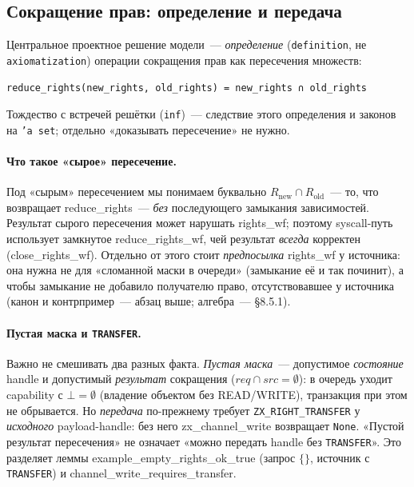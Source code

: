 \documentclass[11pt,a4paper]{article}
\newcommand{\isabel}[1]{{\isabelleit #1}}
\newcommand{\lemmaname}[1]{\isabel{#1}}
\begin{document}
\subsection{Сокращение прав: определение и передача}

Центральное проектное решение модели~--- \emph{определение}
(\texttt{definition}, не \texttt{axiomatization}) операции сокращения
прав как пересечения множеств:
\begin{lstlisting}
reduce_rights(new_rights, old_rights) = new_rights ∩ old_rights
\end{lstlisting}
Тождество с встречей решётки (\texttt{inf})~--- следствие этого определения
и законов на \texttt{'a~set}; отдельно «доказывать пересечение» не нужно.

\paragraph{Что такое «сырое» пересечение.}
Под «сырым» пересечением мы понимаем буквально
$R_{\mathrm{new}} \cap R_{\mathrm{old}}$~--- то, что возвращает
\lemmaname{reduce\_rights}~--- \emph{без} последующего замыкания
зависимостей. Результат сырого пересечения может нарушать
\lemmaname{rights\_wf}; поэтому syscall-путь использует замкнутое
\lemmaname{reduce\_rights\_wf}, чей результат \emph{всегда}
корректен (\lemmaname{close\_rights\_wf}). Отдельно от этого стоит
\emph{предпосылка} \lemmaname{rights\_wf} у источника: она нужна не для
«сломанной маски в очереди» (замыкание её и так починит), а чтобы
замыкание не добавило получателю право, отсутствовавшее у источника
(канон и контрпример~--- абзац выше; алгебра~--- §8.5.1).

\paragraph{Пустая маска и \texttt{TRANSFER}.}
Важно не смешивать два разных факта. \emph{Пустая маска}~--- допустимое
\emph{состояние} handle и допустимый \emph{результат} сокращения
($\mathit{req}\cap\mathit{src}=\emptyset$): в очередь уходит
\textenglish{capability} с $\bot=\emptyset$ (владение объектом без
READ/WRITE), транзакция при этом не обрывается. Но \emph{передача}
по-прежнему требует \texttt{ZX\_RIGHT\_TRANSFER} у \emph{исходного}
payload-handle: без него \lemmaname{zx\_channel\_write} возвращает
\texttt{None}. «Пустой результат пересечения» не означает «можно
передать handle без \texttt{TRANSFER}». Это разделяет леммы
\lemmaname{example\_empty\_rights\_ok\_true} (запрос $\{\}$, источник с
\texttt{TRANSFER}) и
\lemmaname{channel\_write\_requires\_transfer}.
\end{document}
